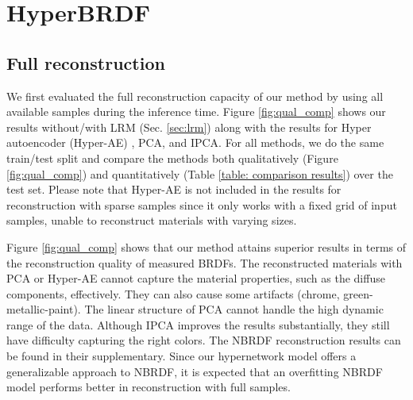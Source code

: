 \chapter{HyperBRDF}
\label{hyperbrdf:add_res}

\section{Full reconstruction}\label{sec:full_rec}

We first evaluated the full reconstruction capacity of our method by using all available samples during the inference time. Figure \ref{fig:qual_comp} shows our results without/with LRM (Sec. \ref{sec:lrm}) along with the results for Hyper autoencoder (Hyper-AE) \cite{sztrajman2021neural}, PCA, and IPCA. For all methods, we do the same train/test split and compare the methods both qualitatively (Figure \ref{fig:qual_comp}) and quantitatively (Table \ref{table: comparison results}) over the test set. Please note that Hyper-AE is not included in the results for reconstruction with sparse samples since it only works with a fixed grid of input samples, unable to reconstruct materials with varying sizes. 


Figure \ref{fig:qual_comp} shows that our method attains superior results in terms of the reconstruction quality of measured BRDFs. The reconstructed materials with PCA or Hyper-AE cannot capture the material properties, such as the diffuse components, effectively. They can also cause some artifacts (chrome, green-metallic-paint). The linear structure of PCA cannot handle the high dynamic range of the data. Although IPCA \cite{nielsen2015optimal} improves the results substantially, they still have difficulty capturing the right colors. The NBRDF \cite{sztrajman2021neural} reconstruction results can be found in their supplementary. Since our hypernetwork model offers a generalizable approach to NBRDF, it is expected that an overfitting NBRDF model performs better in reconstruction with full samples. 

